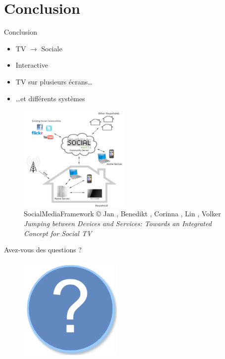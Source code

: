 \documentclass{beamer}
\begin{document}
	\section*{Conclusion}
	\begin{frame}{Conclusion}
		\begin{itemize}
			\item TV $\rightarrow$ Sociale
				\pause
			\item Interactive
				\pause
			\item TV sur plusieurs écrans\ldots
				\pause
			\item \ldots et différents systèmes
		\end{itemize}
		\begin{figure}[H]
			\centering
			\vspace{-17px}
			\includegraphics[width=5.4cm]{images/conclu.png}
			\scriptsize{
			\caption{SocialMediaFramework\newline 
			\tiny © Jan , Benedikt , Corinna , Lin , Volker \newline
			\textit{Jumping between Devices and Services: Towards an Integrated Concept for Social TV}
			}
		}
		\end{figure}
	\end{frame}

	\begin{frame}{Avez-vous des questions ?}
		\begin{figure}[H]
			\centering
			\includegraphics[width=5cm]{questions.png}
		\end{figure}
	\end{frame}
\end{document}
